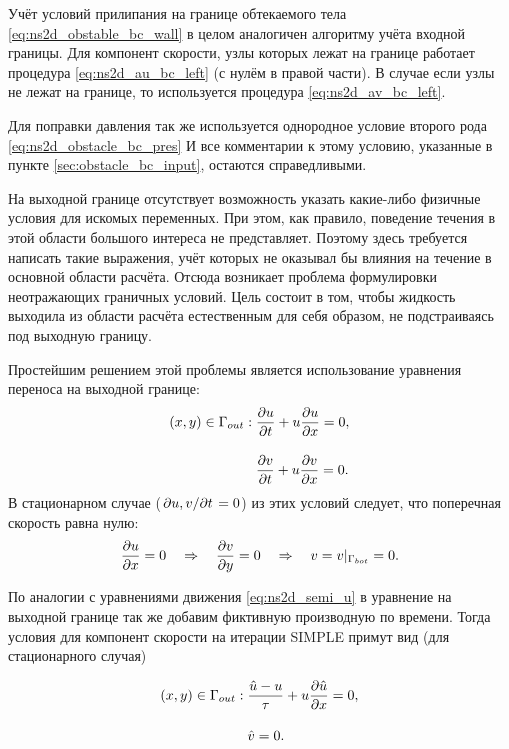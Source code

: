 \label{sec:obstacle-noslip}
Учёт условий прилипания на границе обтекаемого тела \cref{eq:ns2d_obstable_bc_wall}
в целом аналогичен алгоритму учёта входной границы.
Для компонент скорости, узлы которых лежат на границе работает процедура \cref{eq:ns2d_au_bc_left} (с нулём в правой части).
В случае если узлы не лежат на границе, то используется процедура \cref{eq:ns2d_av_bc_left}.

Для поправки давления так же используется однородное условие второго рода \cref{eq:ns2d_obstacle_bc_pres}
И все комментарии к этому условию, указанные в пункте \ref{sec:obstacle_bc_input}, остаются справедливыми.

На выходной границе отсутствует возможность указать какие-либо физичные условия для искомых переменных.
При этом, как правило, поведение течения в этой области большого интереса не представляет.
Поэтому здесь требуется написать такие выражения, учёт которых
не оказывал бы влияния на течение в основной области расчёта.
Отсюда возникает проблема формулировки неотражающих граничных условий.
Цель состоит в том, чтобы жидкость выходила из области расчёта естественным для себя образом, не подстраиваясь под выходную границу.

Простейшим решением этой проблемы является использование уравнения переноса на выходной границе:
\begin{equation}
\label{eq:ns2d_outflow_common}
\begin{aligned}
(x,y)\in\Gamma_{out}:\; &\frac{\partial u}{\partial t} + u\frac{\partial u}{\partial x} = 0,\\[10pt]
                        &\frac{\partial v}{\partial t} + u\frac{\partial v}{\partial x} = 0.
\end{aligned}
\end{equation}
В стационарном случае ($\left.\partial u,v\middle/\partial t\right. = 0$) из этих условий следует, что поперечная скорость равна нулю:
\begin{equation*}
\frac{\partial u}{\partial x} = 0 \quad\Rightarrow\quad \frac{\partial v}{\partial y} = 0 \quad\Rightarrow\quad v = v|_{\Gamma_{bot}} = 0.
\end{equation*}

По аналогии с уравнениями движения \cref{eq:ns2d_semi_u}
в уравнение на выходной границе так же добавим фиктивную производную по времени.
Тогда условия для компонент скорости на итерации SIMPLE примут вид (для стационарного случая)

\begin{equation}
\label{eq:ns2d_outflow_common_semi}
\begin{aligned}
(x,y)\in\Gamma_{out}:\; &\frac{\hat u - u}{\tau} + u\frac{\partial \hat u}{\partial x} = 0,\\[10pt]
                        &\hat v = 0.
\end{aligned}
\end{equation}

